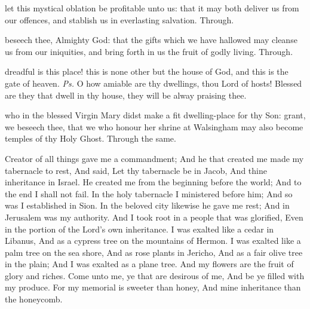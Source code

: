 
\secret
{} let this mystical oblation be profitable unto us: that it may both deliver us from our offences, and stablish us in everlasting salvation. Through.


\postcommunion
{} beseech thee, Almighty God: that the gifts which we have hallowed may cleanse us from our iniquities, and bring forth in us the fruit of godly living. Through.



\introit
{} dreadful is this place! this is none other but the house of God, and this is the gate of heaven. \textit{Ps.} O how amiable are thy dwellings, thou Lord of hosts! Blessed are they that dwell in thy house, they will be alway praising thee.

\collect
{} who in the blessed Virgin Mary didst make a fit dwelling-place for thy Son: grant, we beseech thee, that we who honour her shrine at Walsingham may also become temples of thy Holy Ghost. Through the same.

 Creator of all things gave me a commandment; And he that created me made my tabernacle to rest, And said, Let thy tabernacle be in Jacob, And thine inheritance in Israel. He created me from the beginning before the world; And to the end I shall not fail. In the holy tabernacle I ministered before him; And so was I established in Sion. In the beloved city likewise he gave me rest; And in Jerusalem was my authority.  And I took root in a people that was glorified, Even in the portion of the Lord's own inheritance. I was exalted like a cedar in Libanus, And as a cypress tree on the mountains of Hermon. I was exalted like a palm tree on the sea shore, And as rose plants in Jericho, And as a fair olive tree in the plain; And I was exalted as a plane tree. And my flowers are the fruit of glory and riches. Come unto me, ye that are desirous of me, And be ye filled with my produce. For my memorial is sweeter than honey, And mine inheritance than the honeycomb.


